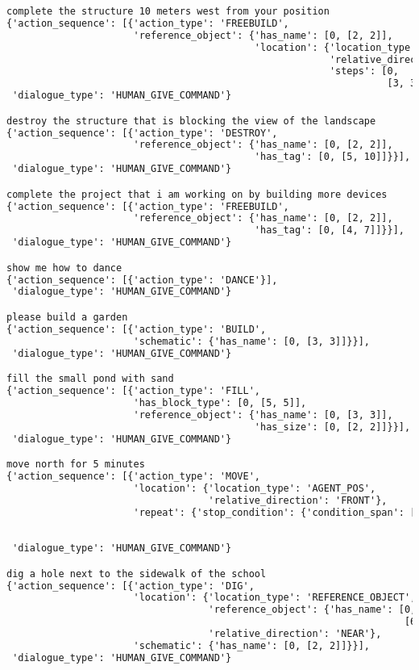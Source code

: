 \begin{lstlisting}[language=TeX]
complete the structure 10 meters west from your position
{'action_sequence': [{'action_type': 'FREEBUILD',
                      'reference_object': {'has_name': [0, [2, 2]],
                                           'location': {'location_type': 'AGENT_POS',
                                                        'relative_direction': 'LEFT',
                                                        'steps': [0,
                                                                  [3, 3]]}}}],
 'dialogue_type': 'HUMAN_GIVE_COMMAND'}

destroy the structure that is blocking the view of the landscape
{'action_sequence': [{'action_type': 'DESTROY',
                      'reference_object': {'has_name': [0, [2, 2]],
                                           'has_tag': [0, [5, 10]]}}],
 'dialogue_type': 'HUMAN_GIVE_COMMAND'}

complete the project that i am working on by building more devices
{'action_sequence': [{'action_type': 'FREEBUILD',
                      'reference_object': {'has_name': [0, [2, 2]],
                                           'has_tag': [0, [4, 7]]}}],
 'dialogue_type': 'HUMAN_GIVE_COMMAND'}

show me how to dance
{'action_sequence': [{'action_type': 'DANCE'}],
 'dialogue_type': 'HUMAN_GIVE_COMMAND'}

please build a garden
{'action_sequence': [{'action_type': 'BUILD',
                      'schematic': {'has_name': [0, [3, 3]]}}],
 'dialogue_type': 'HUMAN_GIVE_COMMAND'}

fill the small pond with sand
{'action_sequence': [{'action_type': 'FILL',
                      'has_block_type': [0, [5, 5]],
                      'reference_object': {'has_name': [0, [3, 3]],
                                           'has_size': [0, [2, 2]]}}],
 'dialogue_type': 'HUMAN_GIVE_COMMAND'}

move north for 5 minutes
{'action_sequence': [{'action_type': 'MOVE',
                      'location': {'location_type': 'AGENT_POS',
                                   'relative_direction': 'FRONT'},
                      'repeat': {'stop_condition': {'condition_span': [0,
                                                                       [3,
                                                                        4]]}}}],
 'dialogue_type': 'HUMAN_GIVE_COMMAND'}

dig a hole next to the sidewalk of the school
{'action_sequence': [{'action_type': 'DIG',
                      'location': {'location_type': 'REFERENCE_OBJECT',
                                   'reference_object': {'has_name': [0,
                                                                     [6, 9]]},
                                   'relative_direction': 'NEAR'},
                      'schematic': {'has_name': [0, [2, 2]]}}],
 'dialogue_type': 'HUMAN_GIVE_COMMAND'}


\end{lstlisting}
